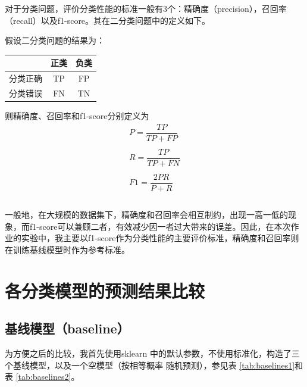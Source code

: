 \documentclass[12pt,a4paper]{article}
\theoremstyle{definition}
\begin{document}
对于分类问题，评价分类性能的标准一般有3个：精确度（precision），召回率（recall）以及f1-score。其在二分类问题中的定义如下。

假设二分类问题的结果为：


\begin{table}[H]
	\centering
	\begin{tabular}{c|c|c}
		& 正类 &  负类 \\
		\hline
		\hline
	
		 分类正确 & TP & FP \\
		 分类错误 & FN & TN \\
	\end{tabular}
\end{table}

则精确度、召回率和f1-score分别定义为
\begin{equation}
	\begin{aligned}
	P = \dfrac{TP}{TP + FP} \\ \\
	R = \dfrac{TP}{TP + FN} \\ \\
	F1 = \dfrac{2PR}{P + R} \\ \\
	\end{aligned}
\end{equation}

\vspace{-0.03\linewidth}
一般地，在大规模的数据集下，精确度和召回率会相互制约，出现一高一低的现象，而f1-score可以兼顾二者，有效减少因一者过大带来的误差。因此，在本次作业的实验中，我主要以f1-score作为分类性能的主要评价标准，精确度和召回率则在训练基线模型时作为参考标准。

\section{各分类模型的预测结果比较}

\subsection{基线模型（baseline）}

为方便之后的比较，我首先使用sklearn \cite{sklearn}中的默认参数，不使用标准化，构造了三个基线模型，以及一个空模型（按相等概率 随机预测），参见表 \ref{tab:baselines1}和表 \ref{tab:baselines2}。
\end{document}
